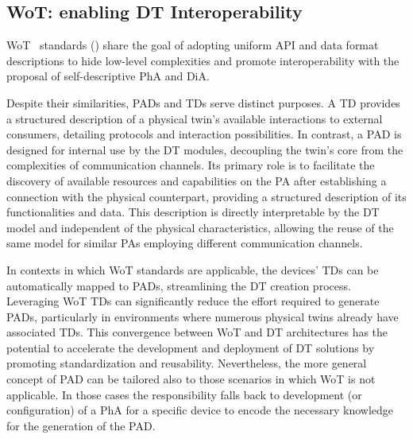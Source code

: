 
\subsection{\acl{WoT}: enabling \ac{DT} Interoperability}
\label{sec:wot-dt-interop}

\ac{WoT}~\cite{wot-arch} standards () share the goal of adopting uniform API and data format descriptions to hide low-level complexities and promote interoperability with the proposal of self-descriptive \ac{PhA} and \ac{DiA}.

Despite their similarities, \acp{PAD} and \acp{TD} serve distinct purposes. 
A \ac{TD} provides a structured description of a physical twin's available interactions to external consumers, detailing protocols and interaction possibilities.
%
In contrast, a \ac{PAD} is designed for internal use by the \ac{DT} modules, decoupling the twin's core from the complexities of communication channels.
Its primary role is to facilitate the discovery of available resources and capabilities on the \ac{PA} after establishing a connection with the physical counterpart, providing a structured description of its functionalities and data.
This description is directly interpretable by the \ac{DT} model and independent of the physical characteristics, allowing the reuse of the same model for similar \acp{PA} employing different communication channels.

In contexts in which \ac{WoT} standards are applicable, the devices' \acp{TD} can be automatically mapped to \acp{PAD}, streamlining the \ac{DT} creation process.
Leveraging \ac{WoT} \acp{TD} can significantly reduce the effort required to generate \acp{PAD}, particularly in environments where numerous physical twins already have associated \acp{TD}.
This convergence between \ac{WoT} and \ac{DT} architectures has the potential to accelerate the development and deployment of \ac{DT} solutions by promoting standardization and reusability.
%
Nevertheless, the more general concept of \ac{PAD} can be tailored also to those scenarios in which \ac{WoT} is not applicable. In those cases the responsibility falls back to development (or configuration) of a \ac{PhA} for a specific device to encode the necessary knowledge for the generation of the \ac{PAD}.

